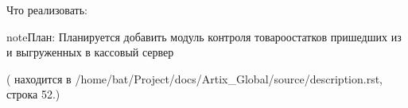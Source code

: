 \documentclass[a4paper,10pt,russian]{report}
\begin{document}
\sphinxAtStartPar
Что реализовать:

\begin{sphinxadmonition}{note}{План:}
\sphinxAtStartPar
Планируется добавить модуль контроля товаро\sphinxhyphen{}остатков пришедших из  и выгруженных в кассовый сервер
\end{sphinxadmonition}

\sphinxAtStartPar
({\hyperref[\detokenize{description:id2}]{}} находится в /home/bat/Project/docs/Artix\_Global/source/description.rst, строка 52.)



\renewcommand{\indexname}{Алфавитный указатель}
\printindex
\end{document}

